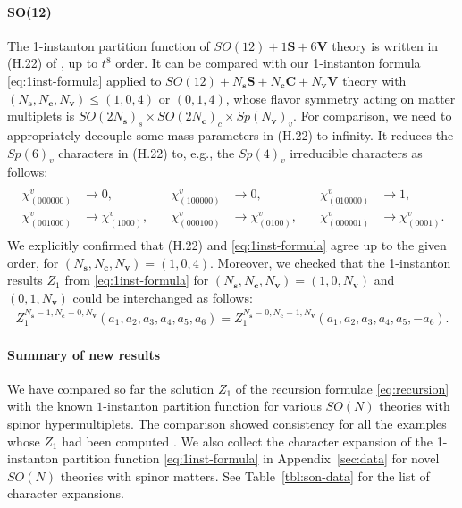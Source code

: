 \documentclass[letterpaper, 11pt]{article}
\begin{document}
{\paragraph{SO(12)}

The 1-instanton partition function of $SO(12) + 1\mathbf{S} + 6\mathbf{V}$ theory  is written in (H.22) of \cite{DelZotto:2018tcj}, up to $t^8$ order. It can be compared with our 1-instanton formula \eqref{eq:1inst-formula} applied to $SO(12) + N_\mathbf{s}\mathbf{S} + N_\mathbf{c}\mathbf{C} + N_\mathbf{v}\mathbf{V}$ theory with $(N_\mathbf{s},N_\mathbf{c}, N_{\mathbf{v}}) \leq (1,0,4)$ or $(0,1,4)$, whose flavor symmetry acting on matter multiplets is $SO(2N_\mathbf{s})_s \times SO(2N_\mathbf{c})_c \times Sp(N_\mathbf{v})_v$. For comparison, we need to appropriately decouple some mass parameters in (H.22) to infinity. It reduces the $Sp(6)_v$ characters in (H.22) to, e.g., the $Sp(4)_v$ irreducible characters as follows:
\begin{align}
\begin{split}
\begin{array}{llllll}
  \chi^{v}_{(000000)} &\rightarrow 0, & \quad \chi^{v}_{(100000)}&\rightarrow 0,& \quad \chi^{v}_{(010000)}&\rightarrow 1, \\ \chi^{v}_{(001000)}&\rightarrow \chi^{v}_{(1000)}, & \quad  \chi^{v}_{(000100)}&\rightarrow \chi^{v}_{(0100)}, & \quad \chi^{v}_{(000001)}&\rightarrow \chi^{v}_{(0001)}.
\end{array}
\end{split}
\end{align}
We explicitly confirmed that (H.22) and \eqref{eq:1inst-formula} agree up to the given order, for $(N_\mathbf{s},N_\mathbf{c}, N_{\mathbf{v}}) = (1,0,4)$. Moreover, we checked that the 1-instanton results ${Z}_1$ from \eqref{eq:1inst-formula} for $(N_\mathbf{s},N_\mathbf{c}, N_{\mathbf{v}})= (1,0,N_\mathbf{v})$ and $(0,1,N_\mathbf{v})$ could be interchanged as follows: 
\begin{align}
Z_{1}^{N_{\mathbf{s}}=1,N_\mathbf{c}=0,N_{\mathbf{v}}}(a_1,a_2,a_3,a_4,a_5,a_6) =Z_{1}^{N_{\mathbf{s}}=0,N_\mathbf{c}=1,N_{\mathbf{v}}}(a_1,a_2,a_3,a_4,a_5,-a_6).
\end{align}


\paragraph{Summary of new results}
We have compared so far the solution $Z_1$ of the recursion formulae \eqref{eq:recursion} with the known $1$-instanton partition function for various $SO(N)$ theories with spinor hypermultiplets. The comparison showed consistency for all the examples whose $Z_1$ had been computed \cite{Kim:2018gjo,DelZotto:2018tcj}. We also collect the character expansion of the 1-instanton partition function \eqref{eq:1inst-formula} in Appendix~\ref{sec:data} for novel $SO(N)$ theories with spinor matters. See Table~\ref{tbl:son-data} for the list of character expansions.


}
\end{document}
